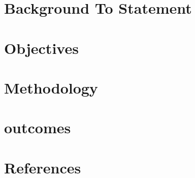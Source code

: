 \documentclass[a4paper,12pt]{report}
\begin{document}
\section{{\large Background To Statement}}


\section{{\large Objectives}}

\section{{\large Methodology}}

\section{{\large outcomes}}

\section{{\large References}}


 
\end{document}

